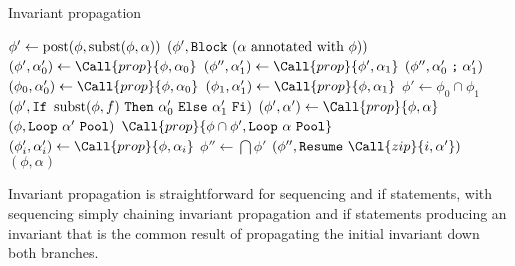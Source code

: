\begin{algorithm}
  \caption{Invariant propagation}\label{algo:prop}
  \begin{algorithmic}
      \State $\phi'\gets\operatorname{post}(\phi,\operatorname{subst}(\phi,\alpha))$
      \State\Return $(\phi',\texttt{Block}~(\alpha\text{ annotated with }\phi))$
    \EndFunction
      \State $(\phi',\alpha_0')\gets\Call{prop}{\phi,\alpha_0}$
      \State $(\phi'',\alpha_1')\gets\Call{prop}{\phi',\alpha_1}$
      \State\Return $(\phi'',\alpha_0'\mathrel{\texttt{;}} \alpha_1')$
    \EndFunction
      \State $(\phi_0,\alpha'_0)\gets\Call{prop}{\phi,\alpha_0}$
      \State $(\phi_1,\alpha'_1)\gets\Call{prop}{\phi,\alpha_1}$
      \State $\phi'\gets\phi_0\cap\phi_1$
      \State\Return $(\phi',\texttt{If}~\operatorname{subst}(\phi,f)~\texttt{Then}~
        \alpha'_0~\texttt{Else}~\alpha'_1~\texttt{Fi})$
    \EndFunction
      \State $(\phi',\alpha')\gets\Call{prop}{\phi,\alpha}$
        \State\Return $(\phi,\texttt{Loop}~\alpha'~\texttt{Pool})$
      \Else
        \State\Return $\Call{prop}{\phi\cap\phi',\AWhile~\alpha~\AOd}$
      \EndIf
    \EndFunction
        \State $(\phi'_i,\alpha'_i)\gets\Call{prop}{\phi,\alpha_i}$
      \EndFor
      \State $\phi''\gets\bigcap\phi'$
      \State\Return $(\phi'',\AWhileResume~\Call{zip}{i,\alpha'})$
    \EndFunction
      \State\Return $(\phi,\alpha)$
    \EndFunction
  \end{algorithmic}
\end{algorithm}
Invariant propagation is straightforward for sequencing and if statements,
with sequencing simply chaining invariant propagation
and if statements producing an invariant that is the common result
of propagating the initial invariant down both branches.

